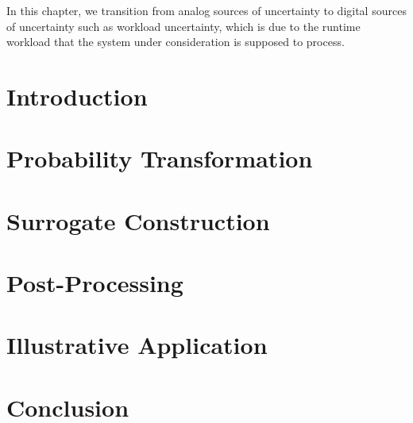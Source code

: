 In this chapter, we transition from analog sources of uncertainty to digital
sources of uncertainty such as workload uncertainty, which is due to the runtime
workload that the system under consideration is supposed to process.

\section{Introduction}

\section{\exampletitle}

\section{\problemtitle}

\section{\priortitle}

\section{\solutiontitle}

\section{Probability Transformation}

\section{Surrogate Construction}

\section{Post-Processing}

\section{Illustrative Application}

\section{\resultstitle}

\section{Conclusion}
